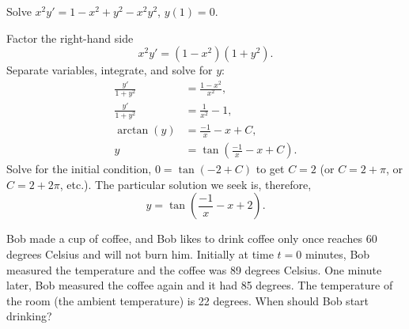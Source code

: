 \documentclass{ximera}
\begin{document}
\begin{example}
    Solve $x^2y' = 1 - x^2+y^2 - x^2y^2$, $y(1) = 0$.
\end{example}
\begin{exampleSol}
    Factor the right-hand side
    \begin{equation*}
        x^2y' = (1 - x^2)(1+y^2) .
    \end{equation*}
    Separate variables, integrate, and solve for $y$:
    \begin{align*}
        \frac{y'}{1+y^2} & = \frac{1 - x^2}{x^2} , \\
        \frac{y'}{1+y^2} & = \frac{1}{x^2} - 1 , \\
        \operatorname{arctan} (y) & = \frac{-1}{x} - x + C , \\
        y & = \tan \left(\frac{-1}{x} - x + C\right) .
    \end{align*}
    Solve for the initial condition, $0 = \tan(-2+C)$ to get $C=2$ (or $C = 2 + \pi$, or $C = 2 + 2\pi$, etc.).  The particular solution we seek is, therefore,
    \begin{equation*}
        y = \tan \left(\frac{-1}{x} - x + 2 \right) .
    \end{equation*}
\end{exampleSol}

\begin{example} \label{sep:coffeeexample}
    Bob made a cup of coffee, and Bob likes to drink coffee only once reaches 60 degrees Celsius and will not burn him. Initially at time $t=0$ minutes, Bob measured the temperature and the coffee was 89 degrees Celsius. One minute later, Bob measured the coffee again and it had 85 degrees. The temperature of the room (the ambient temperature) is 22 degrees. When should Bob start drinking?
\end{example}
\end{document}

